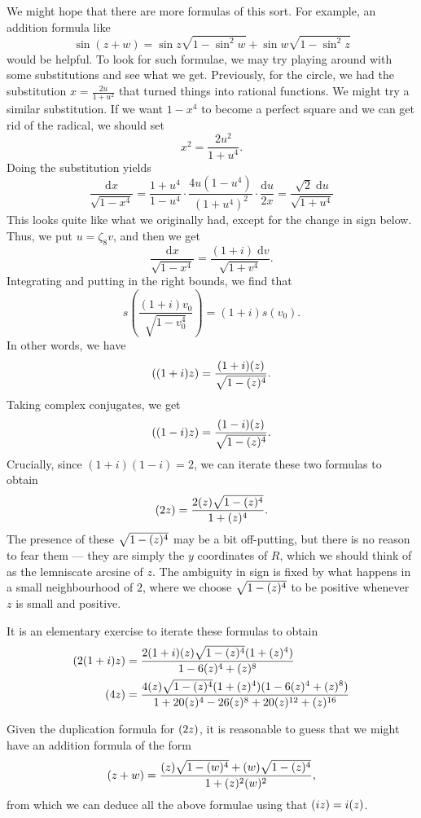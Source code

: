 \documentclass{shortart}
\theoremstyle{definition}
\renewcommand\d{\mathrm{d}}
\let\sl\relax
\DeclareMathOperator\sl{sl}
\begin{document}
We might hope that there are more formulas of this sort. For example, an addition formula like
\[
  \sin(z + w) = \sin z \sqrt{1 - \sin^2 w} + \sin w \sqrt{1 - \sin^2 z}
\]
would be helpful. To look for such formulae, we may try playing around with some substitutions and see what we get. Previously, for the circle, we had the substitution $x = \frac{2u}{1 + u^2}$ that turned things into rational functions. We might try a similar substitution. If we want $1 - x^4$ to become a perfect square and we can get rid of the radical, we should set
\[
  x^2 = \frac{2u^2}{1 + u^4}.
\]
Doing the substitution yields
\[
  \frac{\d x}{\sqrt{1 - x^4}} = \frac{1 + u^4}{1 - u^4} \cdot \frac{4u(1 - u^4)}{(1 + u^4)^2} \cdot \frac{\d u}{2x} = \frac{\sqrt{2}\;\d u}{\sqrt{1 + u^4}}
\]
This looks quite like what we originally had, except for the change in sign below. Thus, we put $u = \zeta_8 v$, and then we get
\[
  \frac{\d x}{\sqrt{1 - x^4}} = \frac{(1 + i)\;\d v}{\sqrt{1 + v^4}}.
\]
Integrating and putting in the right bounds, we find that
\[
  s\left(\frac{(1 + i) v_0}{\sqrt{1 - v_0^4}}\right) = (1 + i) s(v_0).
\]
In other words, we have
\[
  \sl((1 + i)z) = \frac{(1 + i) \sl(z)}{\sqrt{1 - \sl(z)^4}}.
\]
Taking complex conjugates, we get
\[
  \sl((1 - i)z) = \frac{(1 - i) \sl(z)}{\sqrt{1 - \sl(z)^4}}.
\]
Crucially, since $(1 + i)(1 - i) = 2$, we can iterate these two formulas to obtain
\[
  \sl(2z) = \frac{2\sl(z)\sqrt{1 - \sl(z)^4}}{1 + \sl(z)^4}.
\]
The presence of these $\sqrt{1 - \sl(z)^4}$ may be a bit off-putting, but there is no reason to fear them --- they are simply the $y$ coordinates of $R$, which we should think of as the lemniscate arcsine of $z$. The ambiguity in sign is fixed by what happens in a small neighbourhood of $2$, where we choose $\sqrt{1 - \sl(z)^4}$ to be positive whenever $z$ is small and positive.

It is an elementary exercise to iterate these formulas to obtain
\begin{align*}
  \sl(2(1 + i)z) &= \frac{2(1 + i) \sl(z) \sqrt{1 - \sl(z)^4} (1 + \sl(z)^4)}{1 - 6 \sl(z)^4 + \sl(z)^8}\\
  \sl(4z) &= \frac{4\sl(z) \sqrt{1 - \sl(z)^4} (1 + \sl(z)^4) (1 - 6 \sl(z)^4 + \sl(z)^8)}{1 + 20 \sl(z)^4 - 26 \sl(z)^8 + 20 \sl(z)^{12} + \sl(z)^{16}}
\end{align*}

Given the duplication formula for $\sl(2z)$, it is reasonable to guess that we might have an addition formula of the form
\[
  \sl(z + w) = \frac{\sl(z) \sqrt{1 - \sl(w)^4} + \sl(w) \sqrt{1 - \sl(z)^4}}{1 + \sl(z)^2 \sl(w)^2},
\]
from which we can deduce all the above formulae using that $\sl(iz) = i \sl(z)$.
\end{document}
